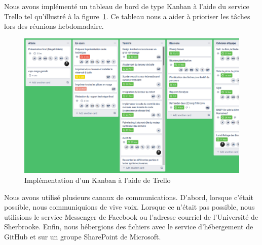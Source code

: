 Nous avons implémenté un tableau de bord de type Kanban à l'aide du service Trello tel qu'illustré à la figure~\ref{fig:planif-trello}.
Ce tableau nous a aider à prioriser les tâches lors des réunions hebdomadaire.

\begin{figure}[h!]
    \centering
    \includegraphics[width=\linewidth]{img/s1/trello}
    \caption{Implémentation d'un Kanban à l'aide de Trello}
    \label{fig:planif-trello}
\end{figure}

Nous avons utilisé plusieurs canaux de communications.
D'abord, lorsque c'était possible, nous communiquions de vive voix.
Lorsque ce n'était pas possible, nous utilisions le service Messenger de Facebook ou l'adresse courriel de l’Université de Sherbrooke.
Enfin, nous hébergions des fichiers avec le service d'hébergement de GitHub et sur un groupe SharePoint de Microsoft.
